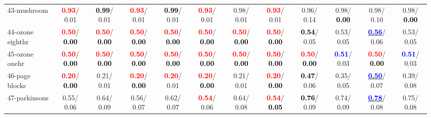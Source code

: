 \begin{table}[h]
\begin{center}
{\begin{tabular}{lc|c|c|c|c|c|c|c|c|c|c}
43-mushroom & \textcolor{red}{\textbf{  0.93}}/  0.01 & \textcolor{black}{\textbf{  0.99}}/  0.01 & \textcolor{red}{\textbf{  0.93}}/  0.01 & \textcolor{black}{\textbf{  0.99}}/  0.01 & \textcolor{red}{\textbf{  0.93}}/  0.01 &   0.98/  0.01 & \textcolor{red}{\textbf{  0.93}}/  0.01 &   0.96/  0.14 &   0.98/\textcolor{black}{\textbf{  0.00}} &   0.98/  0.10 &   0.98/\textcolor{black}{\textbf{  0.00}} \\
44-ozone eighthr & \textcolor{red}{\textbf{  0.50}}/\textcolor{black}{\textbf{  0.00}} & \textcolor{red}{\textbf{  0.50}}/\textcolor{black}{\textbf{  0.00}} & \textcolor{red}{\textbf{  0.50}}/\textcolor{black}{\textbf{  0.00}} & \textcolor{red}{\textbf{  0.50}}/\textcolor{black}{\textbf{  0.00}} & \textcolor{red}{\textbf{  0.50}}/\textcolor{black}{\textbf{  0.00}} & \textcolor{red}{\textbf{  0.50}}/\textcolor{black}{\textbf{  0.00}} & \textcolor{red}{\textbf{  0.50}}/\textcolor{black}{\textbf{  0.00}} & \textcolor{black}{\textbf{  0.54}}/  0.05 &   0.53/  0.05 & \underline{\textcolor{blue}{\textbf{  0.56}}}/  0.06 &   0.53/  0.05 \\
45-ozone onehr & \textcolor{red}{\textbf{  0.50}}/\textcolor{black}{\textbf{  0.00}} & \textcolor{red}{\textbf{  0.50}}/\textcolor{black}{\textbf{  0.00}} & \textcolor{red}{\textbf{  0.50}}/\textcolor{black}{\textbf{  0.00}} & \textcolor{red}{\textbf{  0.50}}/\textcolor{black}{\textbf{  0.00}} & \textcolor{red}{\textbf{  0.50}}/\textcolor{black}{\textbf{  0.00}} & \textcolor{red}{\textbf{  0.50}}/\textcolor{black}{\textbf{  0.00}} & \textcolor{red}{\textbf{  0.50}}/\textcolor{black}{\textbf{  0.00}} & \textcolor{red}{\textbf{  0.50}}/\textcolor{black}{\textbf{  0.00}} & \textcolor{blue}{\textbf{  0.51}}/  0.03 & \textcolor{red}{\textbf{  0.50}}/\textcolor{black}{\textbf{  0.00}} & \textcolor{blue}{\textbf{  0.51}}/  0.03 \\
46-page blocks & \textcolor{red}{\textbf{  0.20}}/\textcolor{black}{\textbf{  0.00}} &   0.21/  0.01 & \textcolor{red}{\textbf{  0.20}}/\textcolor{black}{\textbf{  0.00}} & \textcolor{red}{\textbf{  0.20}}/  0.01 & \textcolor{red}{\textbf{  0.20}}/\textcolor{black}{\textbf{  0.00}} &   0.21/  0.01 & \textcolor{red}{\textbf{  0.20}}/\textcolor{black}{\textbf{  0.00}} & \textcolor{black}{\textbf{  0.47}}/  0.06 &   0.35/  0.05 & \underline{\textcolor{blue}{\textbf{  0.50}}}/  0.07 &   0.39/  0.08 \\ \hline
47-parkinsons &   0.55/  0.06 &   0.64/  0.09 &   0.56/  0.07 &   0.62/  0.07 & \textcolor{red}{\textbf{  0.54}}/  0.06 &   0.64/  0.08 & \textcolor{red}{\textbf{  0.54}}/\textcolor{black}{\textbf{  0.05}} & \textcolor{black}{\textbf{  0.76}}/  0.09 &   0.74/  0.09 & \underline{\textcolor{blue}{\textbf{  0.78}}}/  0.08 &   0.75/  0.08 \\

\end{tabular}}
\end{center}
\end{table}
